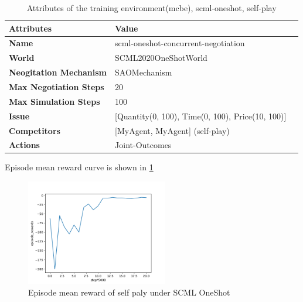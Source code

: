 \begin{table}[htbp]
\centering
\begin{tabular}{l l l} \toprule
\bfseries \textbf{Attributes}    & \bfseries \textbf{Value}                                             \\ \midrule
\textbf{Name}                    & scml-oneshot-concurrent-negotiation                                  \\
\textbf{World}                   & SCML2020OneShotWorld                                                 \\
\textbf{Neogitation Mechanism}   & SAOMechanism                                                         \\
\textbf{Max Negotiation Steps}   & 20                                                                  \\
\textbf{Max Simulation Steps}    & 100                                                                   \\
\textbf{Issue}             	     & [Quantity(0, 100), Time(0, 100), Price(10, 100)]                     \\
\textbf{Competitors}             & [MyAgent, MyAgent] (self-play)                                       \\
\textbf{Actions}                 & Joint-Outcomes                                                             \\
\bottomrule
\end{tabular}
\caption{Attributes of the training environment(mcbe), scml-oneshot, self-play}
\label{tab:attributes-mcbe-concurrent-negotiation-scml-oneshot}
\end{table}

Episode mean reward curve is shown in \ref{fig:oneshot-self-play}

\begin{figure}[htbp]
\centering
\includegraphics[width=0.55\textwidth]{./images/oneshot_self_play.png}
\caption{Episode mean reward of self paly under SCML OneShot}
\label{fig:oneshot-self-play}
\end{figure}

